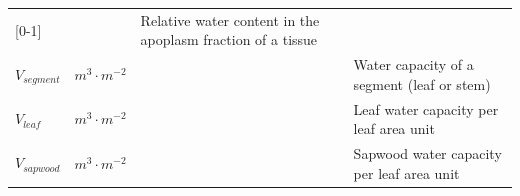 \documentclass[]{book}
\begin{document}
\begin{longtable}[]{@{}llll@{}}
\begin{minipage}[t]{0.10\columnwidth}
{[}0-1{]}\strut
\end{minipage} & \begin{minipage}[t]{0.12\columnwidth}\raggedright
\strut
\end{minipage} & \begin{minipage}[t]{0.45\columnwidth}\raggedright
Relative water content in the apoplasm fraction of a tissue\strut
\end{minipage}\tabularnewline
\begin{minipage}[t]{0.11\columnwidth}\raggedright
\(V_{segment}\)\strut
\end{minipage} & \begin{minipage}[t]{0.10\columnwidth}\raggedright
\(m^3 \cdot m^{-2}\)\strut
\end{minipage} & \begin{minipage}[t]{0.12\columnwidth}\raggedright
\strut
\end{minipage} & \begin{minipage}[t]{0.45\columnwidth}\raggedright
Water capacity of a segment (leaf or stem)\strut
\end{minipage}\tabularnewline
\begin{minipage}[t]{0.11\columnwidth}\raggedright
\(V_{leaf}\)\strut
\end{minipage} & \begin{minipage}[t]{0.10\columnwidth}\raggedright
\(m^3 \cdot m^{-2}\)\strut
\end{minipage} & \begin{minipage}[t]{0.12\columnwidth}\raggedright
\strut
\end{minipage} & \begin{minipage}[t]{0.45\columnwidth}\raggedright
Leaf water capacity per leaf area unit\strut
\end{minipage}\tabularnewline
\begin{minipage}[t]{0.11\columnwidth}\raggedright
\(V_{sapwood}\)\strut
\end{minipage} & \begin{minipage}[t]{0.10\columnwidth}\raggedright
\(m^3 \cdot m^{-2}\)\strut
\end{minipage} & \begin{minipage}[t]{0.12\columnwidth}\raggedright
\strut
\end{minipage} & \begin{minipage}[t]{0.45\columnwidth}\raggedright
Sapwood water capacity per leaf area unit\strut
\end{minipage}\tabularnewline
\bottomrule
\end{longtable}
\end{document}
